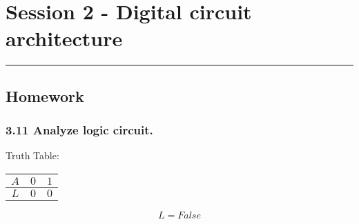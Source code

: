 \section{Session 2 - Digital circuit architecture}
\vspace{-15pt}\noindent\rule{\textwidth}{0.1pt}\vspace{-10pt}
    \subsection{Homework}
    \subsubsection{3.11 \textnormal{Analyze logic circuit}.}
    {\color{hwSolution}
        Truth Table:
        \begin{center}
            \begin{tabular}{c|c c}
                $A$ & $0$ & $1$ \\
                \hline
                $L$ & $0$ & $0$ \\
            \end{tabular}
            \[L = False\]
        \end{center}

}
